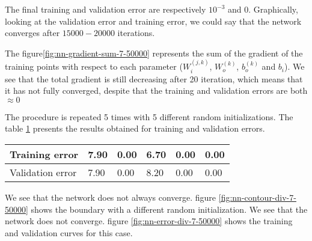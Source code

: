 \documentclass{article}
\begin{document}
The final training and validation error are respectively $10^{-3}$ and
$0$.  Graphically, looking at the validation error and training error,
we could say that the network converges after $15000-20000$ iterations.

The figure\ref{fig:nn-gradient-sum-7-50000} represents the sum of the
gradient of the training points with respect to each parameter
($W_i^{(j, k)}$, $W_o^{(k)}$, $b_o^{(k)}$ and $b_i$).  We see that the
total gradient is still decreasing after 20 iteration, which means
that it has not fully converged, despite that the training and
validation errors are both $\approx 0$





The procedure is repeated 5 times with 5 different random
initializations. The table \ref{tab:error-5-try} presents the results
obtained for training and validation errors.
\begin{table}[h!]
  \centering
  \begin{tabular}{|l|l|l|l|l|l|}
    \hline
    Training error & 7.90 & 0.00 & 6.70 & 0.00 & 0.00 \\
    \hline
    Validation error & 7.90 & 0.00 & 8.20 & 0.00 & 0.00 \\
    \hline
  \end{tabular}
   \label{tab:error-5-try}
\end{table}

We see that the network does not always converge. figure
\ref{fig:nn-contour-div-7-50000} shows the boundary with a different
random initialization. We see that the network does not converge.
figure \ref{fig:nn-error-div-7-50000} shows the training and
validation curves for this case.
\end{document}
